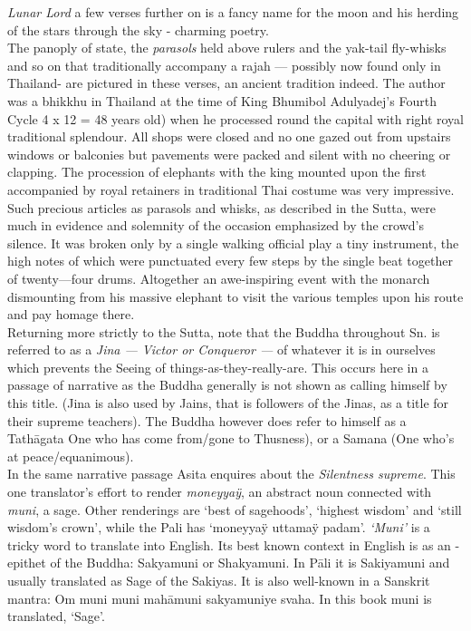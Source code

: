 \textit{Lunar Lord} a few verses further on is a fancy name for the moon and his herding of the stars through the sky - charming poetry.\\

The panoply of state, the \textit{parasols} held above rulers and the yak-tail ﬂy-whisks and so on that traditionally accompany a rajah — possibly now found only in Thailand- are pictured in these verses, an ancient tradition indeed. The author was a bhikkhu in Thailand at the time of King Bhumibol Adulyadej's Fourth Cycle 4 x 12 = 48 years old) when he processed round the capital with right royal traditional splendour. All shops were closed and no one gazed out from upstairs windows or balconies but pavements were packed and silent with no cheering or clapping. The procession of elephants with the king mounted upon the first accompanied by royal retainers in traditional Thai costume was very impressive. Such precious articles as parasols and whisks, as described in the Sutta, were much in evidence and solemnity of the occasion emphasized by the crowd's silence. It was broken only by a single walking official play a tiny instrument, the high notes of which were punctuated every few steps by the single beat together of twenty—four drums. Altogether an awe-inspiring event with the monarch dismounting from his massive elephant to visit the various temples upon his route and pay homage there.\\

Returning more strictly to the Sutta, note that the Buddha throughout Sn. is referred to as a \textit{Jina — Victor or Conqueror —} of whatever it is in ourselves which prevents the Seeing of things-as-they-really-are. This occurs here in a passage of narrative as the Buddha generally is not shown as calling himself by this title. (Jina is also used by Jains, that is followers of the Jinas, as a title for their supreme teachers). The Buddha however does refer to himself as a Tath\=agata One who has come from/gone to Thusness), or a Samana (One who's at peace/equanimous).\\

In the same narrative passage Asita enquires about the \textit{Silentness supreme}. This one translator's effort to render \textit{moneyya\"y}, an abstract noun connected with \textit{muni}, a sage. Other renderings are `best of sagehoods', `highest wisdom' and `still wisdom's crown', while the Pali has `moneyya\"y uttama\"y padam'. \textit{`Muni'} is a tricky word to translate into English. Its best known context in English is as an -epithet of the Buddha: Sakyamuni or Shakyamuni. In P\=ali it is Sakiyamuni and usually translated as Sage of the Sakiyas. It is also well-known in a Sanskrit mantra: Om muni muni mah\=amuni sakyamuniye svaha. In this book muni is translated, `Sage'.\\

